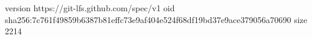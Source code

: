 version https://git-lfs.github.com/spec/v1
oid sha256:7c761f49859b6387b81effc73e9af404e524f68df19bd37e9ace379056a70690
size 2214
